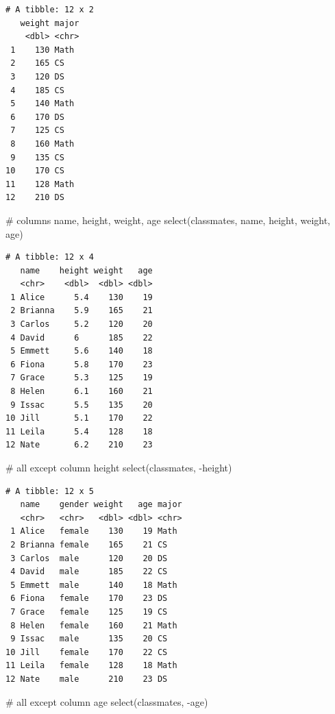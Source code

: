\documentclass[
  letterpaper,
  DIV=11,
  numbers=noendperiod]{scrreprt}
\newenvironment{Shaded}{\begin{snugshade}}{\end{snugshade}}
\newcommand{\CommentTok}[1]{\textcolor[rgb]{0.37,0.37,0.37}{#1}}
\newcommand{\FunctionTok}[1]{\textcolor[rgb]{0.28,0.35,0.67}{#1}}
\newcommand{\NormalTok}[1]{\textcolor[rgb]{0.00,0.23,0.31}{#1}}
\newcommand{\SpecialCharTok}[1]{\textcolor[rgb]{0.37,0.37,0.37}{#1}}
\begin{document}
\begin{tcolorbox}
\begin{verbatim}
# A tibble: 12 x 2
   weight major
    <dbl> <chr>
 1    130 Math 
 2    165 CS   
 3    120 DS   
 4    185 CS   
 5    140 Math 
 6    170 DS   
 7    125 CS   
 8    160 Math 
 9    135 CS   
10    170 CS   
11    128 Math 
12    210 DS   
\end{verbatim}

\begin{Shaded}
\begin{Highlighting}[]
\CommentTok{\# columns name, height, weight, age}
\FunctionTok{select}\NormalTok{(classmates, name, height, weight, age)}
\end{Highlighting}
\end{Shaded}

\begin{verbatim}
# A tibble: 12 x 4
   name    height weight   age
   <chr>    <dbl>  <dbl> <dbl>
 1 Alice      5.4    130    19
 2 Brianna    5.9    165    21
 3 Carlos     5.2    120    20
 4 David      6      185    22
 5 Emmett     5.6    140    18
 6 Fiona      5.8    170    23
 7 Grace      5.3    125    19
 8 Helen      6.1    160    21
 9 Issac      5.5    135    20
10 Jill       5.1    170    22
11 Leila      5.4    128    18
12 Nate       6.2    210    23
\end{verbatim}

\begin{Shaded}
\begin{Highlighting}[]
\CommentTok{\# all except column height}
\FunctionTok{select}\NormalTok{(classmates, }\SpecialCharTok{{-}}\NormalTok{height)}
\end{Highlighting}
\end{Shaded}

\begin{verbatim}
# A tibble: 12 x 5
   name    gender weight   age major
   <chr>   <chr>   <dbl> <dbl> <chr>
 1 Alice   female    130    19 Math 
 2 Brianna female    165    21 CS   
 3 Carlos  male      120    20 DS   
 4 David   male      185    22 CS   
 5 Emmett  male      140    18 Math 
 6 Fiona   female    170    23 DS   
 7 Grace   female    125    19 CS   
 8 Helen   female    160    21 Math 
 9 Issac   male      135    20 CS   
10 Jill    female    170    22 CS   
11 Leila   female    128    18 Math 
12 Nate    male      210    23 DS   
\end{verbatim}

\begin{Shaded}
\begin{Highlighting}[]
\CommentTok{\# all except column age}
\FunctionTok{select}\NormalTok{(classmates, }\SpecialCharTok{{-}}\NormalTok{age)}
\end{Highlighting}
\end{Shaded}


\end{tcolorbox}
\end{document}
